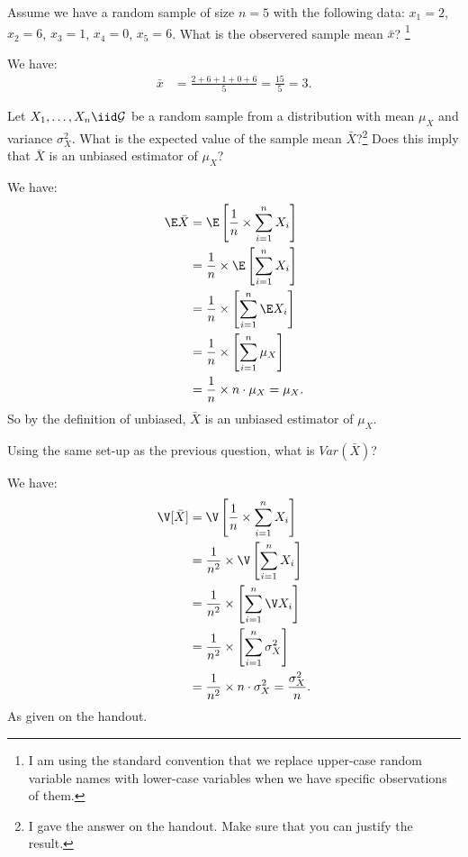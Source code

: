 
Assume we have a random sample of size $n = 5$ with the following data:
$x_1 = 2$, $x_2 = 6$, $x_3 = 1$, $x_4 = 0$, $x_5 = 6$. What is the observered
sample mean $\bar{x}$? 
\footnote{
  I am using the standard convention that we replace upper-case random 
  variable names with lower-case variables when we have specific 
  observations of them. 
}


We have:
\begin{align*}
\bar{x} &= \frac{2 + 6 + 1 + 0 + 6}{5} = \frac{15}{5} = 3.
\end{align*}


Let $X_1, \ldots, X_n \iid \mathcal{G}$ be a random sample from a distribution
with mean $\mu_X$ and variance $\sigma^2_X$. What is the expected value of the
sample mean $\bar{X}$?\footnote{
  I gave the answer on the handout. Make sure that you can justify
  the result.
} Does this imply that $\bar{X}$ is an unbiased estimator of $\mu_X$?


We have:
\begin{align*}
\E \bar{X} &= \E \left[ \frac{1}{n} \times \sum_{i=1}^n X_i \right] \\
&= \frac{1}{n} \times \E \left[ \sum_{i=1}^n X_i \right] \\
&= \frac{1}{n} \times \left[ \sum_{i=1}^n \E X_i \right] \\
&= \frac{1}{n} \times \left[ \sum_{i=1}^n \mu_X \right] \\
&= \frac{1}{n} \times n \cdot \mu_X = \mu_X.
\end{align*}
So by the definition of unbiased, $\bar{X}$ is an unbiased estimator of $\mu_X$.



Using the same set-up as the previous question, what is $Var(\bar{X})$?


We have:
\begin{align*}
\V [\bar{X}] &= \V \left[ \frac{1}{n} \times \sum_{i=1}^n X_i \right] \\
&= \frac{1}{n^2} \times \V \left[ \sum_{i=1}^n X_i \right] \\
&= \frac{1}{n^2} \times \left[ \sum_{i=1}^n \V X_i \right] \\
&= \frac{1}{n^2} \times \left[ \sum_{i=1}^n \sigma_X^2 \right] \\
&= \frac{1}{n^2} \times n \cdot \sigma_X^2 = \frac{\sigma_X^2}{n}.
\end{align*}
As given on the handout.

